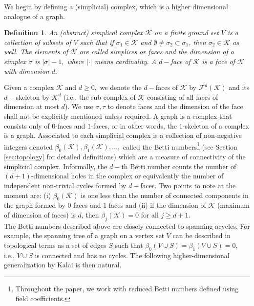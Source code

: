 \documentclass[12pt]{amsart}
\newtheorem{definition}[theorem]{Definition}
\numberwithin{equation}{section}
\numberwithin{theorem}{section}
\newcommand{\1}{\mathbf{1}}
\def\F{\mathcal{F}}
\def\K{\mathcal{K}}
\begin{document}
We begin by defining a (simplicial) complex, which is a higher dimensional analogue of a graph.
%
\begin{definition}
\label{def:complex}
An \emph{(abstract) simplical complex} $\K$ on a finite {\em ground set} $V$ is a collection of subsets of $V$ such that if $\sigma_1 \in \K$ and $\emptyset \neq \sigma_2 \subset \sigma_1$, then $\sigma_2 \in \K$ as well. The elements of $\K$ are called {\em simplices or faces} and the dimension of a simplex $\sigma$ is $|\sigma| - 1,$ where $|\cdot|$ means cardinality. A $d-$face of $\K$ is a face of $\K$ with dimension $d.$
\end{definition}
%
Given a complex $\K$ and $d \geq 0,$ we denote the $d-$faces of $\K$ by $\F^d(\K)$ and its $d-$skeleton by $\K^d$ (i.e., the sub-complex of $\K$ consisting of all faces of dimension at most $d$). We use $\sigma, \tau$ to denote faces and the dimension of the face shall not be explicitly mentioned unless required. A graph is a complex that consists only of $0$-faces and $1$-faces, or in other words, the $1$-skeleton of a complex is a graph. Associated to each simplicial complex is a collection of non-negative integers denoted $\beta_0(\K),\beta_1(\K),\ldots,$ called the Betti numbers\footnote{Throughout the paper, we work with reduced Betti numbers defined using field coefficients.} (see Section \ref{sec:topology} for detailed definitions) which are a measure of connectivity of the simplicial complex. Informally, the $d-$th Betti number counts the number of $(d + 1)$-dimensional holes in the complex or equivalently the number of independent non-trivial cycles formed by $d-$faces. Two points to note at the moment are: (i) $\beta_0(\K)$ is one less than the number of connected components in the graph formed by  $0$-faces and $1$-faces and (ii) if the dimension of $\K$ (maximum of dimension of faces) is $d$, then $\beta_j(\K) = 0$ for all $j \geq d+1$. \\


The Betti numbers described above are closely connected to spanning acycles. For example, the spanning tree of a graph on a vertex set $V$ can be described in topological terms as a set of edges $S$ such that $\beta_0(V \cup S) = \beta_1(V \cup S) = 0,$ i.e., $V \cup S$ is connected and has no cycles. The following higher-dimensional generalization by Kalai \cite{kalai1983enumeration} is then natural.
\end{document}
